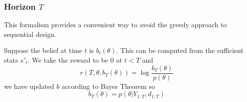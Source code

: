 \subsubsection{Horizon $T$}
This formalism provides a convenient way to avoid the greedy approach to sequential design.

Suppose the belief at time $t$ is $b_t(\theta)$. This can be computed from the sufficient stats $s'_t$. We take the reward to be $0$ at $t<T$ and
\begin{equation}
	r(T, \theta, b_T(\theta)) = \log \frac{b_T(\theta) }{p(\theta)}
\end{equation}
we have updated $b$ according to Bayes Theorem so
\begin{equation}
	b_T(\theta) = p(\theta | Y_{1:T}, d_{1:T})
\end{equation}